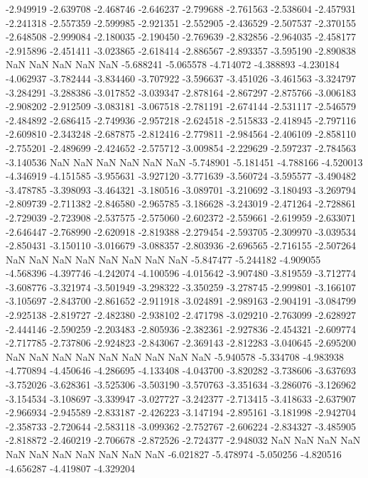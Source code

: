-2.949919
-2.639708
-2.468746
-2.646237
-2.799688
-2.761563
-2.538604
-2.457931
-2.241318
-2.557359
-2.599985
-2.921351
-2.552905
-2.436529
-2.507537
-2.370155
-2.648508
-2.999084
-2.180035
-2.190450
-2.769639
-2.832856
-2.964035
-2.458177
-2.915896
-2.451411
-3.023865
-2.618414
-2.886567
-2.893357
-3.595190
-2.890838
NaN
NaN
NaN
NaN
NaN
-5.688241
-5.065578
-4.714072
-4.388893
-4.230184
-4.062937
-3.782444
-3.834460
-3.707922
-3.596637
-3.451026
-3.461563
-3.324797
-3.284291
-3.288386
-3.017852
-3.039347
-2.878164
-2.867297
-2.875766
-3.006183
-2.908202
-2.912509
-3.083181
-3.067518
-2.781191
-2.674144
-2.531117
-2.546579
-2.484892
-2.686415
-2.749936
-2.957218
-2.624518
-2.515833
-2.418945
-2.797116
-2.609810
-2.343248
-2.687875
-2.812416
-2.779811
-2.984564
-2.406109
-2.858110
-2.755201
-2.489699
-2.424652
-2.575712
-3.009854
-2.229629
-2.597237
-2.784563
-3.140536
NaN
NaN
NaN
NaN
NaN
NaN
-5.748901
-5.181451
-4.788166
-4.520013
-4.346919
-4.151585
-3.955631
-3.927120
-3.771639
-3.560724
-3.595577
-3.490482
-3.478785
-3.398093
-3.464321
-3.180516
-3.089701
-3.210692
-3.180493
-3.269794
-2.809739
-2.711382
-2.846580
-2.965785
-3.186628
-3.243019
-2.471264
-2.728861
-2.729039
-2.723908
-2.537575
-2.575060
-2.602372
-2.559661
-2.619959
-2.633071
-2.646447
-2.768990
-2.620918
-2.819388
-2.279454
-2.593705
-2.309970
-3.039534
-2.850431
-3.150110
-3.016679
-3.088357
-2.803936
-2.696565
-2.716155
-2.507264
NaN
NaN
NaN
NaN
NaN
NaN
NaN
NaN
-5.847477
-5.244182
-4.909055
-4.568396
-4.397746
-4.242074
-4.100596
-4.015642
-3.907480
-3.819559
-3.712774
-3.608776
-3.321974
-3.501949
-3.298322
-3.350259
-3.278745
-2.999801
-3.166107
-3.105697
-2.843700
-2.861652
-2.911918
-3.024891
-2.989163
-2.904191
-3.084799
-2.925138
-2.819727
-2.482380
-2.938102
-2.471798
-3.029210
-2.763099
-2.628927
-2.444146
-2.590259
-2.203483
-2.805936
-2.382361
-2.927836
-2.454321
-2.609774
-2.717785
-2.737806
-2.924823
-2.843067
-2.369143
-2.812283
-3.040645
-2.695200
NaN
NaN
NaN
NaN
NaN
NaN
NaN
NaN
NaN
-5.940578
-5.334708
-4.983938
-4.770894
-4.450646
-4.286695
-4.133408
-4.043700
-3.820282
-3.738606
-3.637693
-3.752026
-3.628361
-3.525306
-3.503190
-3.570763
-3.351634
-3.286076
-3.126962
-3.154534
-3.108697
-3.339947
-3.027727
-3.242377
-2.713415
-3.418633
-2.637907
-2.966934
-2.945589
-2.833187
-2.426223
-3.147194
-2.895161
-3.181998
-2.942704
-2.358733
-2.720644
-2.583118
-3.099362
-2.752767
-2.606224
-2.834327
-3.485905
-2.818872
-2.460219
-2.706678
-2.872526
-2.724377
-2.948032
NaN
NaN
NaN
NaN
NaN
NaN
NaN
NaN
NaN
NaN
NaN
-6.021827
-5.478974
-5.050256
-4.820516
-4.656287
-4.419807
-4.329204
